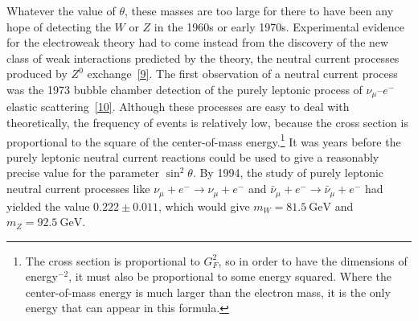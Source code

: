 Whatever the value of $\theta$, these masses are too large for there to have been any hope of detecting the $W$ or $Z$ in the 1960s or early 1970s. Experimental evidence for the electroweak theory had to come instead from the discovery of the new class of weak interactions predicted by the theory, the neutral current processes produced by $Z^0$ exchange~\hyperref[ch21-ref-9]{[9]}. The first observation of a neutral current process was the 1973 bubble chamber detection of the purely leptonic process of $\nu_\mu$--$e^-$ elastic scattering~\hyperref[ch21-ref-10]{[10]}. Although these processes are easy to deal with theoretically, the frequency of events is relatively low, because the cross section is proportional to the square of the center-of-mass energy.\footnote{The cross section is proportional to $G_F^2$, so in order to have the dimensions of energy$^{-2}$, it must also be proportional to some energy squared. Where the center-of-mass energy is much larger than the electron mass, it is the only energy that can appear in this formula.} It was years before the purely leptonic neutral current reactions could be used to give a reasonably precise value for the parameter $\sin^2\theta$. By 1994, the study of purely leptonic neutral current processes like $\nu_\mu+e^-\to\nu_\mu+e^-$ and $\bar\nu_\mu+e^-\to\bar\nu_\mu+e^-$ had yielded the value $0.222\mathbin{\pm}0.011$, which would give $m_W=81.5\ \mathrm{GeV}$ and $m_Z=92.5\ \mathrm{GeV}$.

